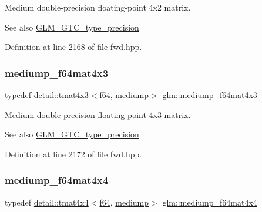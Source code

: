 Medium double-\/precision floating-\/point 4x2 matrix. \begin{DoxySeeAlso}{See also}
\hyperlink{group__gtc__type__precision}{G\+L\+M\+\_\+\+G\+T\+C\+\_\+type\+\_\+precision} 
\end{DoxySeeAlso}


Definition at line 2168 of file fwd.\+hpp.

\mbox{\label{group__gtc__type__precision_ga4a920abfb082b0ffd8d89614cb787021}} 
\subsubsection{\texorpdfstring{mediump\+\_\+f64mat4x3}{mediump\_f64mat4x3}}
{\footnotesize\ttfamily typedef \hyperlink{structglm_1_1detail_1_1tmat4x3}{detail\+::tmat4x3}$<$\hyperlink{group__gtc__type__precision_ga2bba392e555124b36cde6abba349bab3}{f64}, \hyperlink{namespaceglm_a0f04f086094c747d227af4425893f545a6416f3ea0c9025fb21ed50c4d6620482}{mediump}$>$ \hyperlink{group__gtc__type__precision_ga4a920abfb082b0ffd8d89614cb787021}{glm\+::mediump\+\_\+f64mat4x3}}

Medium double-\/precision floating-\/point 4x3 matrix. \begin{DoxySeeAlso}{See also}
\hyperlink{group__gtc__type__precision}{G\+L\+M\+\_\+\+G\+T\+C\+\_\+type\+\_\+precision} 
\end{DoxySeeAlso}


Definition at line 2172 of file fwd.\+hpp.

\mbox{\label{group__gtc__type__precision_ga941e42a0b337b5c8ad9c324aaa6b2ad5}} 
\subsubsection{\texorpdfstring{mediump\+\_\+f64mat4x4}{mediump\_f64mat4x4}}
{\footnotesize\ttfamily typedef \hyperlink{structglm_1_1detail_1_1tmat4x4}{detail\+::tmat4x4}$<$\hyperlink{group__gtc__type__precision_ga2bba392e555124b36cde6abba349bab3}{f64}, \hyperlink{namespaceglm_a0f04f086094c747d227af4425893f545a6416f3ea0c9025fb21ed50c4d6620482}{mediump}$>$ \hyperlink{group__gtc__type__precision_ga941e42a0b337b5c8ad9c324aaa6b2ad5}{glm\+::mediump\+\_\+f64mat4x4}}

